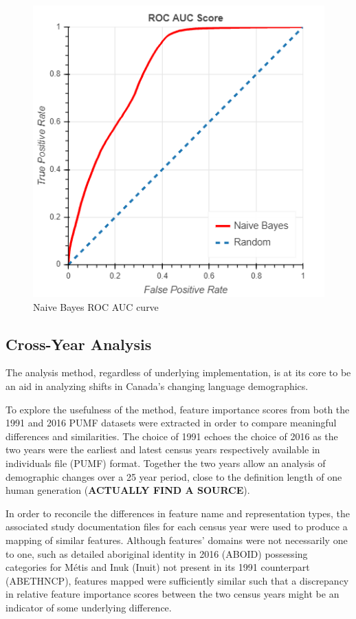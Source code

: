 \documentclass[10pt, conference, compsocconf]{IEEEtran}
\begin{document}
\begin{figure}
  \includegraphics[scale=0.45]{naive_bayes_roc}
  \centering
  \caption{Naive Bayes ROC AUC curve}
  \label{fig:naive_bayes_roc}
\end{figure}

\subsection{Cross-Year Analysis}


The analysis method, regardless of underlying implementation, is at its core to be an aid in analyzing shifts in Canada's changing language demographics.

To explore the usefulness of the method, feature importance scores from both the 1991 and 2016 PUMF datasets were extracted in order to compare meaningful differences and similarities.  The choice of 1991 echoes the choice of 2016 as the two years were the earliest and latest census years respectively available in individuals file (PUMF) format.  Together the two years allow an analysis of demographic changes over a 25 year period, close to the definition length of one human generation (\textbf{ACTUALLY FIND A SOURCE}).

In order to reconcile the differences in feature name and representation types, the associated study documentation files for each census year were used to produce a mapping of similar features.  Although features' domains were not necessarily one to one, such as detailed aboriginal identity in 2016 (ABOID) possessing categories for Métis and Inuk (Inuit) not present in its 1991 counterpart (ABETHNCP), features mapped were sufficiently similar such that a discrepancy in relative feature importance scores between the two census years might be an indicator of some underlying difference.
\end{document}
